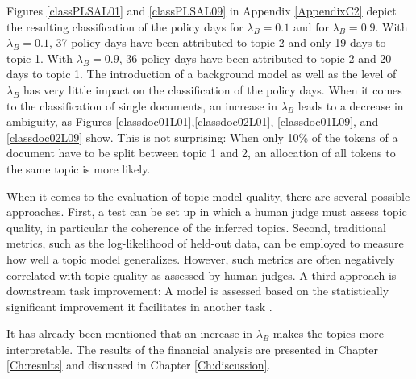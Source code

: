 \documentclass[11pt,a4paper,english,oneside]{book}
\numberwithin{equation}{chapter}
\begin{document}
Figures \ref{classPLSAL01} and \ref{classPLSAL09} in Appendix \ref{AppendixC2} depict the resulting classification of the policy days for $\lambda_B=0.1$ and for $\lambda_B=0.9$. With $\lambda_B=0.1$, 37 policy days have been attributed to topic 2 and only 19 days to topic 1. With  $\lambda_B=0.9$,  36 policy days have been attributed to topic 2 and 20 days to topic 1. The introduction of a background model as well as the level of $\lambda_B$ has very little impact on the classification of the policy days. When it comes to the classification of single documents, an increase in $\lambda_B$ leads to a decrease in ambiguity, as Figures \ref{classdoc01L01},\ref{classdoc02L01}, \ref{classdoc01L09}, and \ref{classdoc02L09} show. This is not surprising: When only 10\% of the tokens of a document have to be split between topic 1 and 2, an allocation of all tokens to the same topic is more likely.


When it comes to the evaluation of topic model quality, there are several possible approaches. First, a test can be set up in which a human judge must assess topic quality, in particular the coherence of the inferred topics. Second, traditional metrics, such as the log-likelihood of held-out data, can be employed to measure how well a topic model generalizes. However, such metrics are often negatively correlated with topic quality as assessed by human judges. A third approach is downstream task improvement: A model is assessed based on the statistically significant improvement it facilitates in another task \cite[~pp. 383--384]{Zhai.2016}.

It has already been mentioned that an increase in $\lambda_B$ makes the topics more interpretable. The results of the financial analysis are presented in Chapter \ref{Ch:results} and discussed in Chapter \ref{Ch:discussion}. 
\end{document}

